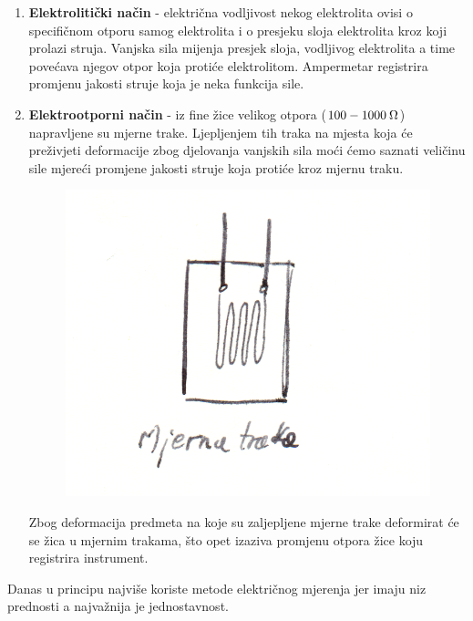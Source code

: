 \documentclass[a4paper,12pt]{article}
\numberwithin{figure}{section}
\begin{document}
\begin{enumerate}
\begin{figure}[!h]
\end{figure}
\FloatBarrier
\item \textbf{Elektrolitički način} - električna vodljivost nekog elektrolita ovisi o specifičnom otporu samog elektrolita i o presjeku sloja elektrolita kroz koji prolazi struja. Vanjska sila mijenja presjek sloja, vodljivog elektrolita a time povećava njegov otpor koja protiće elektrolitom. Ampermetar registrira promjenu jakosti struje koja je neka funkcija sile.
\item \textbf{Elektrootporni način} - iz fine žice velikog otpora ($100 - 1000\:\ohm$) napravljene su mjerne trake. Ljepljenjem tih traka na mjesta koja će preživjeti deformacije zbog djelovanja vanjskih sila moći ćemo saznati veličinu sile mjereći promjene jakosti struje koja protiće kroz mjernu traku.
\begin{figure}[!h]
\includegraphics[scale=0.2]{image_10-2.png}
\end{figure}
\FloatBarrier
Zbog deformacija predmeta na koje su zaljepljene mjerne trake deformirat će se žica u mjernim trakama, što opet izaziva promjenu otpora žice koju registrira instrument. 
\end{enumerate}
Danas u principu najviše koriste metode električnog mjerenja jer imaju niz  prednosti a najvažnija je jednostavnost.
\end{document}
